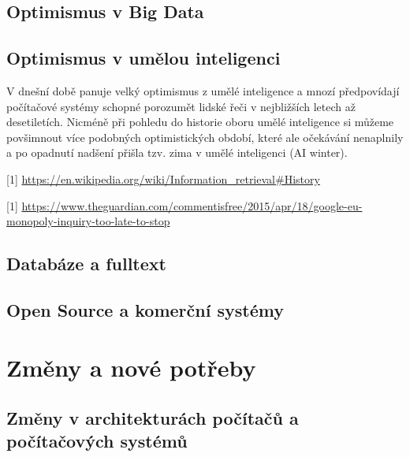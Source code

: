 \documentclass[11pt]{article}
\begin{document}
\subsection{Optimismus v Big Data}



\subsection{Optimismus v umělou inteligenci}
V dnešní době panuje velký optimismus z umělé inteligence a mnozí
předpovídají počítačové systémy schopné porozumět lidské řeči v
nejbližších letech až desetiletích. Nicméně při pohledu do historie
oboru umělé inteligence si můžeme povšimnout více podobných
optimistických období, které ale očekávání nenaplnily a po opadnutí
nadšení přišla tzv. zima v umělé inteligenci (AI winter). 



[1] \url{https://en.wikipedia.org/wiki/Information_retrieval#History}


[1] \url{https://www.theguardian.com/commentisfree/2015/apr/18/google-eu-monopoly-inquiry-too-late-to-stop}

\subsection{Databáze a fulltext}
\subsection{Open Source a komerční systémy}


\section{Změny a nové potřeby}
\subsection{Změny v architekturách počítačů a počítačových systémů}
\end{document}
